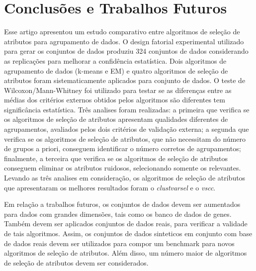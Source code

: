 \documentclass{acm_proc_article-sp}
\begin{document}
\section{Conclusões e Trabalhos Futuros}
\label{sec:conclusions}


Esse artigo apresentou um estudo comparativo entre algoritmos de seleção de atributos para agrupamento de dados.
O design fatorial experimental utilizado para gerar os conjuntos de dados produziu 324 conjuntos de dados considerando as replicações para melhorar a confidência estatística.
Dois algoritmos de agrupamento de dados (k-means e EM) e quatro algoritmos de seleção de atributos foram sistematicamente aplicados para conjunto de dados.
O teste de Wilcoxon/Mann-Whitney foi utilizado para testar se as diferenças entre as médias dos critérios externos obtidos pelos algoritmos são diferentes tem significância estatística.  
Três analises foram realizadas: a primeira que verifica se os algoritmos de seleção de atributos apresentam qualidades diferentes de agrupamentos, avaliados pelos dois critérios de validação externa; a segunda que verifica se os algoritmos de seleção de atributos, que não necessitam do número de grupos a priori, conseguem identificar o número corretos de agrupamentos; finalmente, a terceira que verifica se os algoritmos de seleção de atributos conseguem eliminar os atributos ruidosos, selecionando somente os relevantes.
Levando as três analises em consideração, os algoritmos de seleção de atributos que apresentaram os melhores resultados foram o \textit{clustvarsel} e o \textit{vscc}.

Em relação a trabalhos futuros, os conjuntos de dados devem ser aumentados para dados com grandes dimensões, tais como os banco de dados de genes.
Também devem ser aplicados conjuntos de dados reais, para verificar a validade de tais algoritmos.
Assim, os conjuntos de dados sinteticos em conjunto com base de dados reais devem ser utilizados para compor um benchmark para novos algoritmos de seleção de atributos.
Além disso, um número maior de algoritmos de seleção de atributos devem ser considerados. 



%
\printbibliography %
%
%
%
\end{document}
